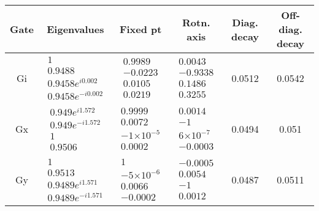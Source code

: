 \documentclass{article}[11pt]
\providecommand{\e}[1]{\ensuremath{\times 10^{#1}}}
\begin{document}
\begin{table}[h]
\small
\begin{center}
\begin{tabular}[l]{|c|c|c|c|c|c|}
\hline
Gate & Eigenvalues & Fixed pt & Rotn. axis & Diag. decay & Off-diag. decay \\ \hline
Gi & $ \begin{array}{c}
1 \\ 
0.9488 \\ 
0.9458e^{i0.002} \\ 
0.9458e^{-i0.002}
 \end{array} $
 & $ \begin{array}{c}
0.9989 \\ 
-0.0223 \\ 
0.0105 \\ 
0.0219
 \end{array} $
 & $ \begin{array}{c}
0.0043 \\ 
-0.9338 \\ 
0.1486 \\ 
0.3255
 \end{array} $
 & 0.0512 & 0.0542 \\ \hline
Gx & $ \begin{array}{c}
0.949e^{i1.572} \\ 
0.949e^{-i1.572} \\ 
1 \\ 
0.9506
 \end{array} $
 & $ \begin{array}{c}
0.9999 \\ 
0.0072 \\ 
-1\e{-5} \\ 
0.0002
 \end{array} $
 & $ \begin{array}{c}
0.0014 \\ 
-1 \\ 
6\e{-7} \\ 
-0.0003
 \end{array} $
 & 0.0494 & 0.051 \\ \hline
Gy & $ \begin{array}{c}
1 \\ 
0.9513 \\ 
0.9489e^{i1.571} \\ 
0.9489e^{-i1.571}
 \end{array} $
 & $ \begin{array}{c}
1 \\ 
-5\e{-6} \\ 
0.0066 \\ 
-0.0002
 \end{array} $
 & $ \begin{array}{c}
-0.0005 \\ 
0.0054 \\ 
-1 \\ 
0.0012
 \end{array} $
 & 0.0487 & 0.0511 \\ \hline
\end{tabular}


\end{center}
\end{table}
\end{document}
